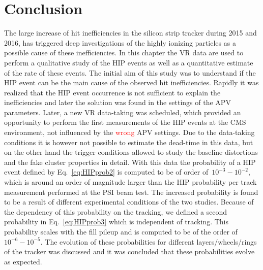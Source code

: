  


\section{Conclusion}

The large increase of hit inefficiencies in the silicon strip tracker during 2015 and 2016, has triggered deep investigations of the highly ionizing particles as a possible cause of these inefficiencies. In this chapter the VR data are used to perform a qualitative study of the HIP events as well as a quantitative estimate of the rate of these events. The initial aim of this study was to understand if the HIP event can be the main cause of the observed hit inefficiencies. Rapidly it was realized that the HIP event occurrence is not sufficient to explain the inefficiencies and later the solution was found in the settings of the APV parameters. Later, a new VR data-taking was scheduled, which provided an opportunity to perform the first measurements of the HIP events at the CMS environment, not influenced by the \textcolor{red}{wrong} APV settings. Due to the data-taking conditions it is however not possible to estimate the dead-time in this data, but on the other hand the trigger conditions allowed to study the baseline distortions and the fake cluster properties in detail. With this data the probability of a HIP event defined by Eq.~\ref{eq:HIPprob2} is computed to be of order of~$10^{-3}-10^{-2}$, which is around an order of magnitude larger than the HIP probability per track measurement performed at the PSI beam test. The increased probability is found to be a result of different experimental conditions of the two studies. Because of the dependency of this probability on the tracking, we defined a second probability in Eq.~\ref{eq:HIPprob3} which is independent of tracking. This probability scales with the fill pileup and is computed to be of the order of~$10^{-6}-10^{-5}$. The evolution of these probabilities for different layers/wheels/rings of the tracker was discussed and it was concluded that these probabilities evolve as expected. %


